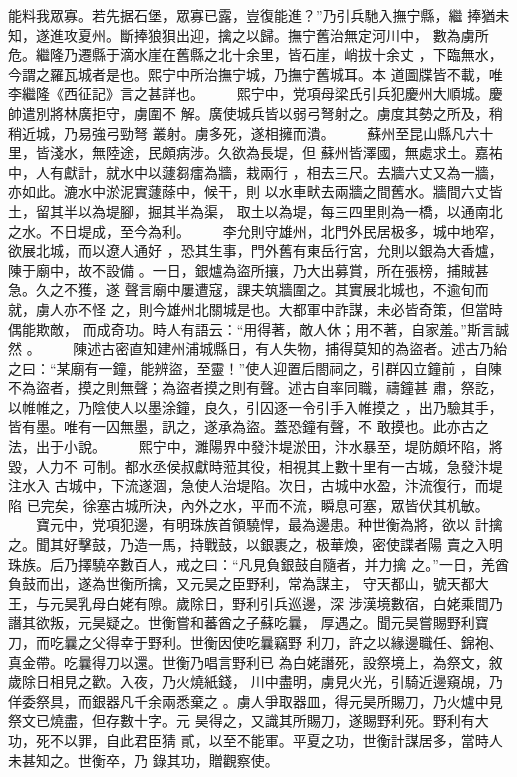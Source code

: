 \documentclass{ctexart}
\begin{document}
能料我眾寡。若先据石堡，眾寡已露，豈復能進？''乃引兵馳入撫宁縣，繼 捧猶未知，遂進攻夏州。斷捧狼狽出迎，擒之以歸。撫宁舊治無定河川中， 數為虜所危。繼隆乃遷縣于滴水崖在舊縣之北十余里，皆石崖，峭拔十余丈 ，下臨無水，今謂之羅瓦城者是也。熙宁中所治撫宁城，乃撫宁舊城耳。本 道圖牒皆不載，唯李繼隆《西征記》言之甚詳也。 　　熙宁中，党項母梁氏引兵犯慶州大順城。慶帥遣別將林廣拒守，虜圍不 解。廣使城兵皆以弱弓弩射之。虜度其勢之所及，稍稍近城，乃易強弓勁弩 叢射。虜多死，遂相擁而潰。 　　蘇州至昆山縣凡六十里，皆淺水，無陸途，民頗病涉。久欲為長堤，但 蘇州皆澤國，無處求土。嘉祐中，人有獻計，就水中以蘧芻癗為牆，栽兩行 ，相去三尺。去牆六丈又為一牆，亦如此。漉水中淤泥實蘧蒢中，候干，則 以水車畎去兩牆之間舊水。牆間六丈皆土，留其半以為堤腳，掘其半為渠， 取土以為堤，每三四里則為一橋，以通南北之水。不日堤成，至今為利。 　　李允則守雄州，北門外民居极多，城中地窄，欲展北城，而以遼人通好 ，恐其生事，門外舊有東岳行宮，允則以銀為大香爐，陳于廟中，故不設備 。一日，銀爐為盜所攘，乃大出募賞，所在張榜，捕賊甚急。久之不獲，遂 聲言廟中屢遭寇，課夫筑牆圍之。其實展北城也，不逾旬而就，虜人亦不怪 之，則今雄州北關城是也。大都軍中詐謀，未必皆奇策，但當時偶能欺敵， 而成奇功。時人有語云：``用得著，敵人休；用不著，自家羞。''斯言誠然 。 　　陳述古密直知建州浦城縣日，有人失物，捕得莫知的為盜者。述古乃紿 之曰：``某廟有一鐘，能辨盜，至靈！''使人迎置后閤祠之，引群囚立鐘前 ，自陳不為盜者，摸之則無聲；為盜者摸之則有聲。述古自率同職，禱鐘甚 肅，祭訖，以帷帷之，乃陰使人以墨涂鐘，良久，引囚逐一令引手入帷摸之 ，出乃驗其手，皆有墨。唯有一囚無墨，訊之，遂承為盜。蓋恐鐘有聲，不 敢摸也。此亦古之法，出于小說。 　　熙宁中，濉陽界中發汴堤淤田，汴水暴至，堤防頗坏陷，將毀，人力不 可制。都水丞侯叔獻時蒞其役，相視其上數十里有一古城，急發汴堤注水入 古城中，下流遂涸，急使人治堤陷。次日，古城中水盈，汴流復行，而堤陷 已完矣，徐塞古城所決，內外之水，平而不流，瞬息可塞，眾皆伏其机敏。 　　寶元中，党項犯邊，有明珠族首領驍悍，最為邊患。种世衡為將，欲以 計擒之。聞其好擊鼓，乃造一馬，持戰鼓，以銀裹之，极華煥，密使諜者陽 賣之入明珠族。后乃擇驍卒數百人，戒之曰：``凡見負銀鼓自隨者，并力擒 之。''一日，羌酋負鼓而出，遂為世衡所擒，又元昊之臣野利，常為謀主， 守天都山，號天都大王，与元昊乳母白姥有隙。歲除日，野利引兵巡邊，深 涉漢境數宿，白姥乘間乃譖其欲叛，元昊疑之。世衡嘗和蕃酋之子蘇吃曩， 厚遇之。聞元昊嘗賜野利寶刀，而吃曩之父得幸于野利。世衡因使吃曩竊野 利刀，許之以緣邊職任、錦袍、真金帶。吃曩得刀以還。世衡乃唱言野利已 為白姥譖死，設祭境上，為祭文，敘歲除日相見之歡。入夜，乃火燒紙錢， 川中盡明，虜見火光，引騎近邊窺覘，乃佯委祭具，而銀器凡千余兩悉棄之 。虜人爭取器皿，得元昊所賜刀，乃火爐中見祭文已燒盡，但存數十字。元 昊得之，又識其所賜刀，遂賜野利死。野利有大功，死不以罪，自此君臣猜 貳，以至不能軍。平夏之功，世衡計謀居多，當時人未甚知之。世衡卒，乃 錄其功，贈觀察使。
\clearpage
\end{document}
